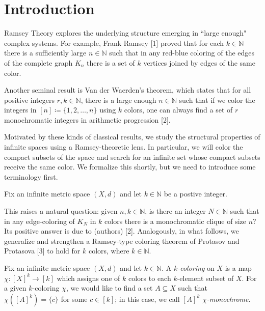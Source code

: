 \section{Introduction}
Ramsey Theory explores the underlying structure emerging in ``large enough" complex systems. For example, Frank Ramsey [1] proved that for each \( k \in \mathbb{N}  \) there is a sufficiently large \( n \in \mathbb{N}  \) such that in any red-blue coloring of the edges of the complete graph \( K_{n} \) there is a set of \( k \) vertices joined by edges of the same color.

Another seminal result is Van der Waerden's theorem, which states that for all positive integers \( r, k \in \mathbb{N}  \), there is a large enough \( n \in \mathbb{N}  \) such that if we color the integers in \( [n] \coloneqq \{ 1,2,\hdots ,n \}  \) using \( k \) colors, one can always find a set of \( r \) monochromatic integers in arithmetic progression [2].

Motivated by these kinds of classical results, we study the structural properties of infinite spaces using a Ramsey-theoretic lens. In particular, we will color the compact subsets of the space and search for an infinite set whose compact subsets receive the same color. We formalize this shortly, but we need to introduce some terminology first.

Fix an infinite metric space \( (X,d) \) and let \( k \in \mathbb{N}  \) be a postive integer. 



\newpage
This raises a natural question: given \( n, k \in \mathbb{N}  \), is there an integer \( N \in \mathbb{N} \) such that in any edge-coloring of \( K_{N}  \) in \( k \) colors there is a monochromatic clique of size \( n \)? Its positive answer is due to (authors) [2]. Analogously, in what follows, we generalize and strengthen a Ramsey-type coloring theorem of Protasov and Protasova [3] to hold for $k$ colors, where \( k \in \mathbb{N}  \).

Fix an infinite metric space \( (X,d) \) and let \( k \in \mathbb{N}  \). A \emph{\( k \)-coloring} on \( X \) is a map \( \chi : [X]^{k} \to [k]  \) which assigns one of \( k \) colors to each \( k \)-element subset of \( X \). For a given \( k \)-coloring \( \chi \), we would like to find a set \( A \subseteq X \) such that \( \chi ([A]^{k}) = \{ c \}  \) for some \( c \in [k] \); in this case, we call \( [A]^{k}  \) \emph{\( \chi \)-monochrome}.

